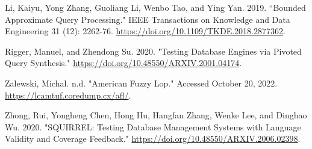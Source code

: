 \documentclass[10pt]{article}
\begin{document}
Li, Kaiyu, Yong Zhang, Guoliang Li, Wenbo Tao, and Ying Yan. 2019. “Bounded Approximate Query Processing." IEEE Transactions on Knowledge and Data Engineering 31 (12): 2262-76. \href{https://doi.org/10.1109/TKDE.2018.2877362}{https://doi.org/10.1109/TKDE.2018.2877362}.

Rigger, Manuel, and Zhendong Su. 2020. "Testing Database Engines via Pivoted Query Synthesis." \href{https://doi.org/10.48550/ARXIV.2001.04174}{https://doi.org/10.48550/ARXIV.2001.04174}.

Zalewski, Michal. n.d. "American Fuzzy Lop." Accessed October 20, 2022. \href{https://lcamtuf.coredump.cx/afl/}{https://lcamtuf.coredump.cx/afl/}.

Zhong, Rui, Yongheng Chen, Hong Hu, Hangfan Zhang, Wenke Lee, and Dinghao Wu. 2020. "SQUIRREL: Testing Database Management Systems with Language Validity and Coverage Feedback." \href{https://doi.org/10.48550/ARXIV.2006.02398}{https://doi.org/10.48550/ARXIV.2006.02398}.
\end{document}
